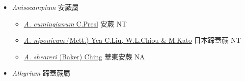 
  \begin{itemize}
 \item[    ] \textit{Anisocampium} 安蕨屬
                                
  \begin{itemize}
        \item[] \href{http://www.theplantlist.org/tpl1.1/search?q=Anisocampium+cumingianum}{\textit{A. cumingianum} C.Presl}   安蕨   NT
        \item[] \href{http://www.theplantlist.org/tpl1.1/search?q=Anisocampium+niponicum}{\textit{A. niponicum} (Mett.) Yea C.Liu, W.L.Chiou \& M.Kato}   日本蹄蓋蕨   NT
        \item[] \href{http://www.theplantlist.org/tpl1.1/search?q=Anisocampium+sheareri}{\textit{A. sheareri} (Baker) Ching}   華東安蕨   NA 
  \end{itemize}
 \item[    ] \textit{Athyrium} 蹄蓋蕨屬
                                

\end{itemize}
